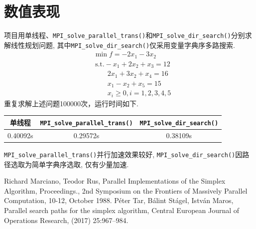 \documentclass[UTF8,a4paper,10pt]{ctexart}
\begin{document}
\section{数值表现}
项目用单线程、\texttt{MPI\_solve\_parallel\_trans()}和\texttt{MPI\_solve\_dir\_search()}分别求解线性规划问题, 其中\texttt{MPI\_solve\_dir\_search()}仅采用变量字典序多路搜索.
\begin{align*}
     & \min f=-2x_1-3x_2                       \\
     & \ \mathrm{s.t.} -x_1 + 2 x_2 + x_3 = 12 \\
     & \qquad 2x_1 + 3x_2 +x_4 = 16            \\
     & \qquad x_1 - x_2 + x_5 = 15             \\
     & \qquad x_i \ge 0 , i=1,2,3,4,5
\end{align*}
重复求解上述问题100000次，运行时间如下.
\begin{table}[h!]
    \begin{center}
        \begin{tabular}{c|c|c}
            单线程   & \texttt{MPI\_solve\_parallel\_trans()} & \texttt{MPI\_solve\_dir\_search()} \\
            \hline
            0.40092s & 0.29572s                               & 0.38109s                           \\
        \end{tabular}
    \end{center}
\end{table}
\texttt{MPI\_solve\_parallel\_trans()}并行加速效果较好, \texttt{MPI\_solve\_dir\_search()}因路径选取为简单字典序选取, 仅有少量加速.
\begin{thebibliography}{5}
    Richard Marciano, Teodor Rus, Parallel Implementations of the Simplex Algorithm, Proceedings., 2nd Symposium on the Frontiers of Massively Parallel Computation, 10-12, October 1988.
    Péter Tar, Bálint Stágel, István Maros, Parallel search paths for the simplex algorithm, Central European Journal of Operations Research, (2017) 25:967–984.
\end{thebibliography}
\end{document}
